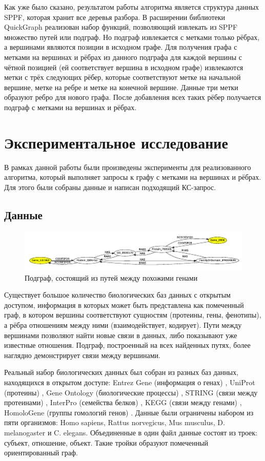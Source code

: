 \documentclass[14pt]{matmex-diploma}
\begin{document}
Как уже было сказано, результатом работы алгоритма является структура данных SPPF, которая хранит все деревья разбора. В расширении библиотеки QuickGraph реализован набор функций,  позволяющий извлекать из SPPF множество путей или подграф. Но подграф извлекается с метками только рёбрах, а вершинами являются позиции в исходном графе. Для получения графа с метками на вершинах и рёбрах из данного подграфа для каждой вершины с чётной позицией (ей соответствует вершина в исходном графе) извлекаются метки с трёх следующих рёбер, которые соответствуют метке на начальной вершине, метке на ребре и метке на конечной вершине. Данные три метки образуют ребро для нового графа. После добавления всех таких рёбер получается подграф с метками на вершинах и рёбрах.


\section{Экспериментальное исследование}

В рамках данной работы были произведены эксперименты для реализованного алгоритма,  который выполняет запросы к графу с метками на вершинах и рёбрах. Для этого были собраны данные и написан подходящий КС-запрос.

\subsection{Данные}

\begin{figure}
\centering
\includegraphics[width=16cm]{images/subgraphY1.pdf}
\caption{Подграф, состоящий из путей между похожими генами}
\label{subgraph}
\end{figure}

Существует большое количество биологических баз данных с открытым доступом, информация в которых может быть представлена как помеченный граф, в котором вершины соответствуют сущностям (протеины, гены, фенотипы), а рёбра отношениям между ними (взаимодействует, кодирует). Пути между вершинами позволяют найти новые связи в данных, либо показывают уже известные отношения. Подграф, построенный на всех найденных путях, более наглядно демонстрирует связи между вершинами.

Реальный набор биологических данных был собран из разных баз данных, находящихся в открытом доступе:  Entrez Gene (информация о генах) \cite{entrezgene}, UniProt (протеины) \cite{uniprot}, Gene Ontology (биологические процессы) \cite{geneontology}, STRING (связи между протеинами) \cite{string}, InterPro (семейства белков) \cite{interpro}, KEGG (связи между генами) \cite{kegg}, HomoloGene (группы гомологий генов) \cite{homologene}. Данные были ограничены набором из пяти организмов: Homo sapiens, Rattus norvegicus, Mus musculus, D. melanogaster и C. elegans. Объединенные в один файл данные состоят из троек: субъект, отношение, объект. Такие тройки образуют помеченный ориентированный граф.
\end{document}
